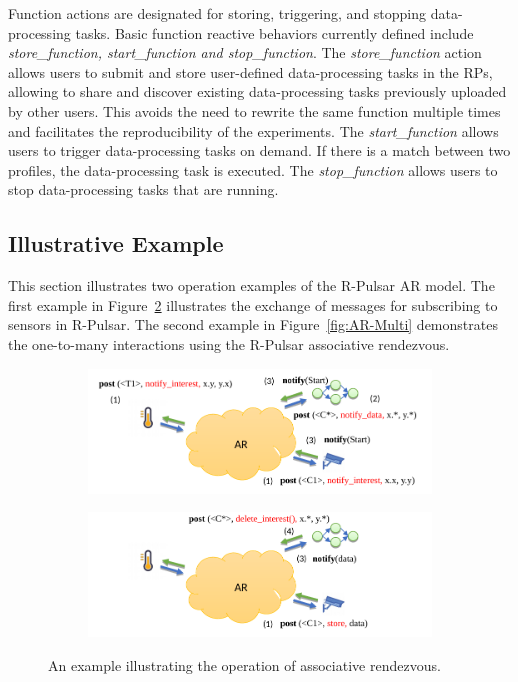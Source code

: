 Function actions are designated for storing, triggering, and stopping data-processing tasks. Basic function reactive behaviors currently defined include {\it store\_function, start\_function and stop\_function}. The {\it store\_function} action allows users to submit and store user-defined data-processing tasks in the RPs, allowing to share and discover existing data-processing tasks previously uploaded by other users. This avoids the need to rewrite the same function multiple times and facilitates the reproducibility of the experiments. The {\it start\_function} allows users to trigger data-processing tasks on demand. If there is a match between two profiles, the data-processing task is executed. The {\it stop\_function} allows users to stop data-processing tasks that are running. 

\subsection{Illustrative Example}

This section illustrates two operation examples of the R-Pulsar AR model. The first example in Figure~\ref{fig:ARExample} illustrates the exchange of messages for subscribing to sensors in R-Pulsar. The second example in Figure~\ref{fig:AR-Multi} demonstrates the one-to-many interactions using the R-Pulsar associative rendezvous.

\begin{figure}[h]
\centering
\begin{subfigure}[b]{0.8\textwidth}
   \includegraphics[width=1.1\linewidth]{Figures/AR_Exmple_1.pdf}
   \caption{}
\end{subfigure}
\begin{subfigure}[b]{0.8\textwidth}
   \includegraphics[width=1.1\linewidth]{Figures/AR_Example_2.pdf}
   \caption{}\label{fig:ARExample2} 
\end{subfigure}
\caption{An example illustrating the operation of associative rendezvous.}\label{fig:ARExample} 
\end{figure}

